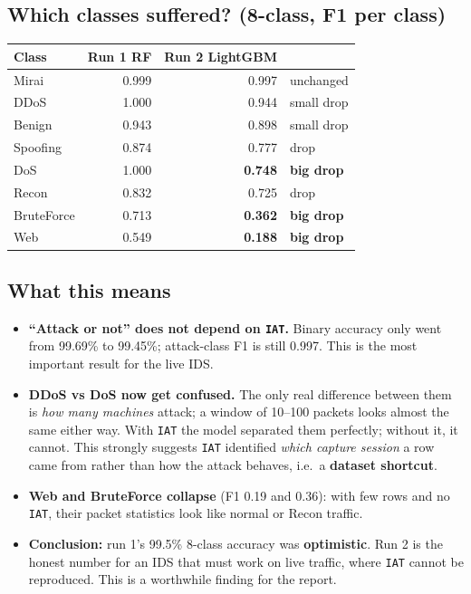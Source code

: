 \documentclass[11pt]{article}
\begin{document}
\subsection*{Which classes suffered? (8-class, F1 per class)}
\begin{center}
\begin{tabular}{@{}l r r l@{}}
\toprule
\textbf{Class} & \textbf{Run 1 RF} & \textbf{Run 2 LightGBM} & \\
\midrule
Mirai & 0.999 & 0.997 & unchanged \\
DDoS & 1.000 & 0.944 & small drop \\
Benign & 0.943 & 0.898 & small drop \\
Spoofing & 0.874 & 0.777 & drop \\
DoS & 1.000 & \textbf{0.748} & \textbf{big drop} \\
Recon & 0.832 & 0.725 & drop \\
BruteForce & 0.713 & \textbf{0.362} & \textbf{big drop} \\
Web & 0.549 & \textbf{0.188} & \textbf{big drop} \\
\bottomrule
\end{tabular}
\end{center}

\subsection*{What this means}
\begin{itemize}
\item \textbf{``Attack or not'' does not depend on \texttt{IAT}.} Binary accuracy only went from 99.69\% to 99.45\%; attack-class F1 is still 0.997.
This is the most important result for the live IDS.
\item \textbf{DDoS vs DoS now get confused.} The only real difference between them is \emph{how many machines} attack; a window of 10--100 packets
looks almost the same either way. With \texttt{IAT} the model separated them perfectly; without it, it cannot. This strongly suggests
\texttt{IAT} identified \emph{which capture session} a row came from rather than how the attack behaves, i.e.\ a \textbf{dataset shortcut}.
\item \textbf{Web and BruteForce collapse} (F1 0.19 and 0.36): with few rows and no \texttt{IAT}, their packet statistics look like normal or Recon traffic.
\item \textbf{Conclusion:} run 1's 99.5\% 8-class accuracy was \textbf{optimistic}. Run 2 is the honest number for an IDS that must work on live traffic,
where \texttt{IAT} cannot be reproduced. This is a worthwhile finding for the report.
\end{itemize}
\end{document}
